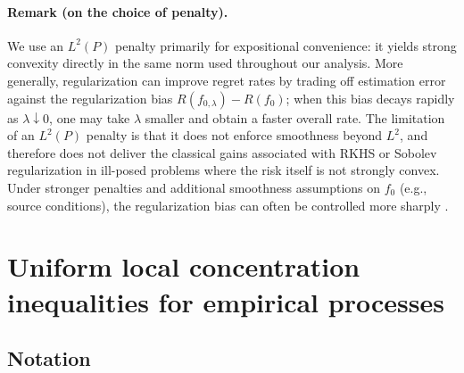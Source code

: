 \documentclass[11pt]{article}
\theoremstyle{plain}
\theoremstyle{definition} %
\begin{document}
\paragraph{Remark (on the choice of penalty).}
We use an $L^2(P)$ penalty primarily for expositional convenience: it yields strong convexity directly in the same norm used throughout our analysis. More generally, regularization can improve regret rates by trading off estimation error against the regularization bias $R(f_{0,\lambda})-R(f_0)$; when this bias decays rapidly as $\lambda \downarrow 0$, one may take $\lambda$ smaller and obtain a faster overall rate. The limitation of an $L^2(P)$ penalty is that it does not enforce smoothness beyond $L^2$, and therefore does not deliver the classical gains associated with RKHS or Sobolev regularization in ill-posed problems where the risk itself is not strongly convex. Under stronger penalties and additional smoothness assumptions on $f_0$ (e.g., source conditions), the regularization bias can often be controlled more sharply \citep{engl1996regularization,caponnetto2007optimal, steinwart2008support, steinwart2009optimal, zhang2025optimal}.



 

 

\section{Uniform local concentration inequalities for empirical processes}





\label{appendix::localmax} 

\subsection{Notation}
\end{document}
